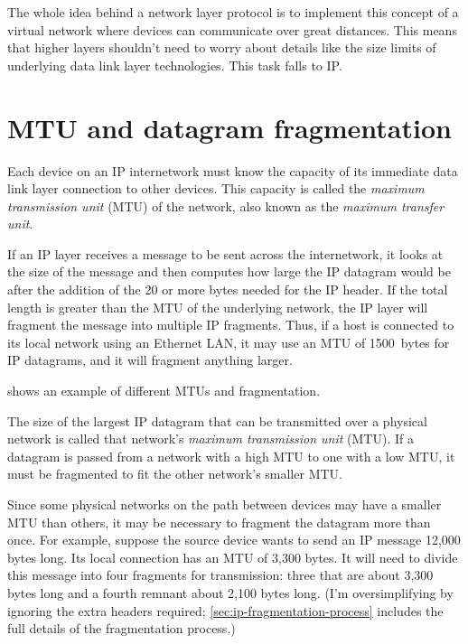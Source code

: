 The whole idea behind a network layer protocol is to implement this concept of a virtual network where devices can communicate over great distances.
This means that higher layers shouldn't need to worry about details like the size limits of underlying data link layer technologies.
This task falls to IP.



\section{MTU and datagram fragmentation}

Each device on an IP internetwork must know the capacity of its immediate data link layer connection to other devices.
This capacity is called the \emph{maximum transmission unit} (MTU) of the network, also known as the \emph{maximum transfer unit}.

If an IP layer receives a message to be sent across the internetwork, it
looks at the size of the message and then computes how large the IP
datagram would be after the addition of the 20 or more bytes needed for
the IP header. If the total length is greater than the MTU of the
underlying network, the IP layer will fragment the message into multiple IP fragments.
Thus, if a host is connected to its local network using an Ethernet LAN, it may use an MTU of 1500~bytes for IP datagrams,
and it will fragment anything larger.

 shows an example of different MTUs and fragmentation.


\begin{keyconcept}
The size of the largest IP datagram that can be transmitted over a physical network is called that network's \emph{maximum transmission unit} (MTU).
If a datagram is passed from a network with a high MTU to one with a low MTU, it must be fragmented to fit the other network's smaller MTU.
\end{keyconcept}

Since some physical networks on the path between devices may have a
smaller MTU than others, it may be necessary to fragment the datagram
more than once. For example, suppose the source device wants to send an
IP message 12,000 bytes long. Its local connection has an MTU of 3,300
bytes. It will need to divide this message into four fragments for
transmission: three that are about 3,300 bytes long and a fourth remnant about 2,100 bytes long.
(I'm oversimplifying by ignoring the extra headers required;
\vref{sec:ip-fragmentation-process} includes the full details of the fragmentation process.)



